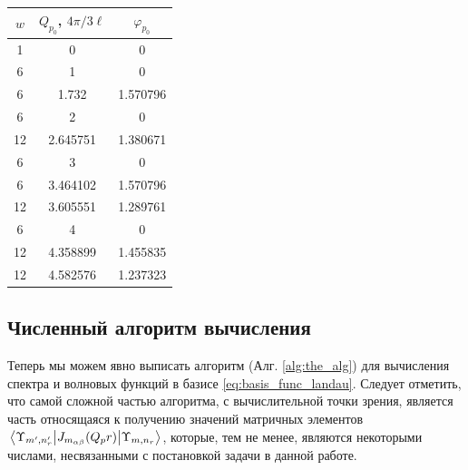 \documentclass[a4paper,article,14pt]{extarticle}
\begin{document}
\begin{center}
\begin{tabular}{ |c|c|c| }
 \hline
 $w$  & $Q_{p_0}$, $4 \pi / 3 \ell$ & $\varphi_{p_0}$\\ 
 \hline
 1&0&0\\
 6&1&0\\
 6&1.732&1.570796\\
 6&2&0\\
 12&2.645751&1.380671\\
 6&3&0\\
 6&3.464102&1.570796\\
 12&3.605551&1.289761\\
 6&4&0\\
 12&4.358899&1.455835\\
 12&4.582576&1.237323\\
 \hline
\end{tabular}
\end{center}


\subsection{Численный алгоритм вычисления }

Теперь мы можем явно выписать алгоритм (Алг. \ref{alg:the_alg}) для вычисления спектра и волновых функций в базисе \eqref{eq:basis_func_landau}. Следует отметить, что самой сложной частью алгоритма, с вычислительной точки зрения, является часть относящаяся к получению  значений матричных элементов $\mel{\Upsilon_{m', n'_r}} {J_{m_{\alpha \beta}} (Q_p r) }{\Upsilon_{m, n_r}}$, которые, тем не менее, являются некоторыми числами, несвязанными с постановкой задачи в данной работе. 
\end{document}
